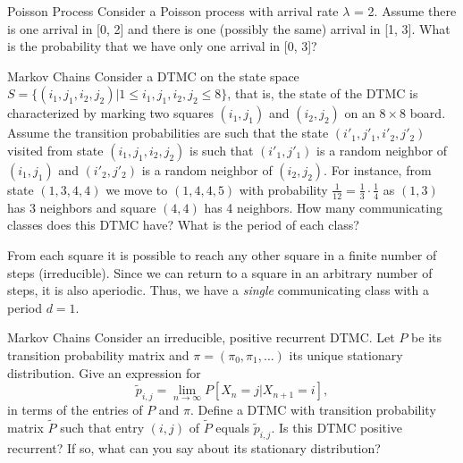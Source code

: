 \begin{problem}{Poisson Process}
Consider a Poisson process with arrival rate $\lambda$ = 2. Assume there is one arrival in [0, 2] and there is one (possibly the same) arrival in [1, 3]. What is the probability that we have only one arrival in [0, 3]?
\end{problem}

\begin{problem}{Markov Chains}
Consider a DTMC on the state space \( S = \{(i_1, j_1, i_2, j_2) | 1 \leq i_1, j_1, i_2, j_2 \leq 8\} \), that is, the state of the DTMC is characterized by marking two squares \( (i_1, j_1) \) and \( (i_2, j_2) \) on an \( 8 \times 8 \) board. Assume the transition probabilities are such that the state \( (i'_1, j'_1, i'_2, j'_2) \) visited from state \( (i_1, j_1, i_2, j_2) \) is such that \( (i'_1, j'_1) \) is a random neighbor of \( (i_1, j_1) \) and \( (i'_2, j'_2) \) is a random neighbor of \( (i_2, j_2) \). For instance, from state \( (1, 3, 4, 4) \) we move to \( (1, 4, 4, 5) \) with probability \( \frac{1}{12} = \frac{1}{3} \cdot \frac{1}{4} \) as \( (1, 3) \) has 3 neighbors and square \( (4, 4) \) has 4 neighbors. How many communicating classes does this DTMC have? What is the period of each class?
\end{problem}

\begin{solution}
  From each square it is possible to reach any other square in a finite number of steps (irreducible). Since we can return to a square in an arbitrary number of steps, it is also aperiodic. Thus, we have a \textit{single} communicating class with a period $d=1$.
\end{solution}

\begin{problem}{Markov Chains}
Consider an irreducible, positive recurrent DTMC. Let \( P \) be its transition probability matrix and \( \pi = (\pi_0, \pi_1, \ldots) \) its unique stationary distribution. Give an expression for
\[
\tilde{p}_{i,j} = \lim_{n \to \infty} P[X_n = j | X_{n+1} = i],
\]
in terms of the entries of \( P \) and \( \pi \). Define a DTMC with transition probability matrix \( \tilde{P} \) such that entry \( (i, j) \) of \( \tilde{P} \) equals \( \tilde{p}_{i,j} \). Is this DTMC positive recurrent? If so, what can you say about its stationary distribution?
\end{problem}


